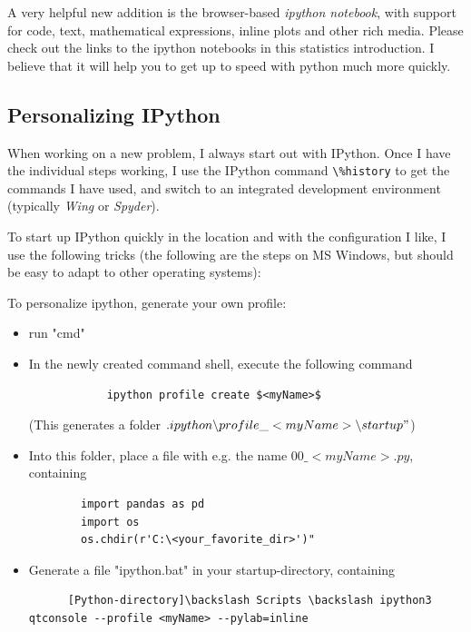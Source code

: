 A very helpful new addition is the browser-based \emph{ipython notebook}, with support for code, text, mathematical expressions, inline plots and other rich media. Please check out the links to the ipython
notebooks in this statistics introduction. I believe that it will  help you to get up to speed with python much more quickly.

\subsection{Personalizing IPython}

When working on a new problem, I always start out with IPython. Once I have the individual steps working, I use the IPython command \lstinline{\%history} to get the commands I have used, and switch to an integrated development environment (typically \emph{Wing} or \emph{Spyder}).

To start up IPython quickly in the location and with the configuration I like, I use the following tricks (the following are the steps on MS Windows, but should be easy to adapt to other operating systems):

To personalize ipython, generate your own profile:

\begin{itemize}
  \item run "cmd"

  \item In the newly created command shell, execute the following command
        \begin{lstlisting}
            ipython profile create $<myName>$
        \end{lstlisting}
        (This generates a folder $.ipython \backslash profile\_<myName> \backslash startup"$)
  \item Into this folder, place a file with e.g. the name $00\_<myName>.py$, containing
        \begin{lstlisting}
        import pandas as pd
        import os
        os.chdir(r'C:\<your_favorite_dir>')"
        \end{lstlisting}
  \item Generate a file "ipython.bat" in your startup-directory, containing
      \begin{lstlisting}
      [Python-directory]\backslash Scripts \backslash ipython3 qtconsole --profile <myName> --pylab=inline
      \end{lstlisting}
\end{itemize}

